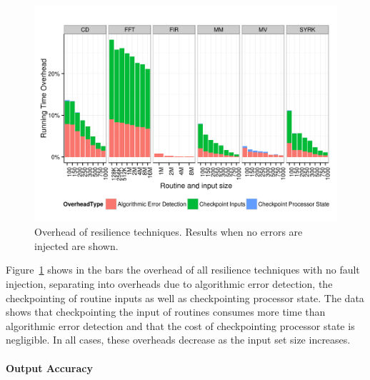 \documentclass{sig-alternate}
\begin{document}
{\begin{figure}[ht!]
\centering
\includegraphics[width=1.00\columnwidth]{figs/4_1_1_Overall_Breakdown.png}
\caption{Overhead of resilience techniques. Results when no errors are injected are shown.}
\label{fig:routine_all_ovhd}
\end{figure}

Figure~\ref{fig:routine_all_ovhd} shows in the bars the overhead of all resilience techniques with no fault injection, separating into overheads due to algorithmic error detection, the checkpointing of routine inputs as well as checkpointing processor state.
The data shows that checkpointing the input of routines consumes more time than algorithmic error detection and that the cost of checkpointing processor state is negligible.
In all cases, these overheads decrease as the input set size increases.

\paragraph{Output Accuracy}

}
\end{document}
